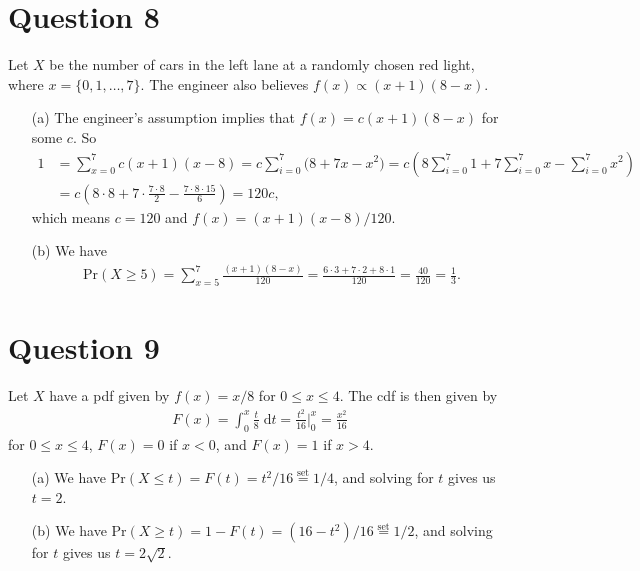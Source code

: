 \documentclass[10pt]{article}
\begin{document}
\section{Question 8} \noindent
Let \(X\) be the number of cars in the left lane at a randomly chosen red light, where \(x = \{0,1,\ldots,7\}\). 
The engineer also believes \(f(x) \propto (x+1)(8-x)\).
\begin{itemize}
    \item[(a)] The engineer's assumption implies that \(f(x) = c(x+1)(8-x)\) for some \(c\). So 
    \begin{align*}
        1 &= \sum_{x=0}^7 c (x+1)(x-8)
        = c \sum_{i=0}^7 \big( 8 + 7x - x^2 \big)
        = c \left( 8 \sum_{i=0}^7 1 + 7 \sum_{i=0}^7 x - \sum_{i=0}^7 x^2 \right) \\
        &= c \left( 8\cdot 8 + 7 \cdot \frac{7 \cdot 8}{2} - \frac{7 \cdot 8 \cdot 15}{6} \right)
        = 120c,
    \end{align*}
    which means \(c = 120\) and \(f(x) = (x+1)(x-8)/120\). 
    \item[(b)] We have 
    \begin{align*}
        \mathrm{Pr}(X \ge 5) = \sum_{x=5}^7 \frac{(x+1)(8-x)}{120}
        = \frac{6\cdot 3 + 7 \cdot 2 + 8 \cdot 1}{120} = \frac{40}{120} = \frac{1}{3}.
    \end{align*}
\end{itemize}

\section{Question 9} \noindent
Let \(X\) have a pdf given by \(f(x) = x/8\) for \(0 \le x \le 4\).
The cdf is then given by
\begin{align*}
    F(x) = \int_0^x \frac{t}{8} \;\mathrm{d}t
    = \frac{t^2}{16} \bigg|_0^x
    = \frac{x^2}{16}
\end{align*}
for \(0 \le x \le 4\), \(F(x) = 0\) if \(x < 0\), and \(F(x) = 1\) if \(x > 4\). 
\begin{itemize}
    \item[(a)] We have \(\mathrm{Pr}(X \le t) = F(t) = t^2 / 16 \overset{\text{set}}{=} 1/4\), and solving for \(t\) gives us \(t = 2\). 
    \item[(b)] We have \(\mathrm{Pr}(X \ge t) = 1 - F(t) = (16 - t^2)/16 \overset{\text{set}}{=} 1/2\), and solving for \(t\) gives us \(t = 2\sqrt{2}\).
\end{itemize}
\end{document}
